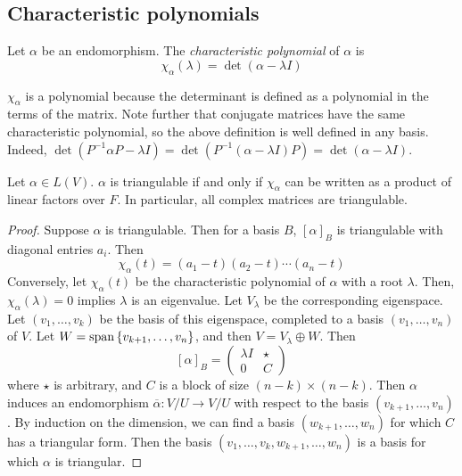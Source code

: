 \subsection{Characteristic polynomials}
\begin{definition}
	Let \( \alpha \) be an endomorphism.
	The \textit{characteristic polynomial} of \( \alpha \) is
	\[
		\chi_\alpha(\lambda) = \det(\alpha - \lambda I)
	\]
\end{definition}
\begin{remark}
	\( \chi_\alpha \) is a polynomial because the determinant is defined as a polynomial in the terms of the matrix.
	Note further that conjugate matrices have the same characteristic polynomial, so the above definition is well defined in any basis.
	Indeed, \( \det(P^{-1}\alpha P - \lambda I) = \det(P^{-1}(\alpha - \lambda I)P) = \det(\alpha - \lambda I) \).
\end{remark}
\begin{theorem}
	Let \( \alpha \in L(V) \).
	\( \alpha \) is triangulable if and only if \( \chi_\alpha \) can be written as a product of linear factors over \( F \).
	In particular, all complex matrices are triangulable.
\end{theorem}
\begin{proof}
	Suppose \( \alpha \) is triangulable.
	Then for a basis \( B \), \( [\alpha]_B \) is triangulable with diagonal entries \( a_i \).
	Then
	\[
		\chi_\alpha(t) = (a_1 - t)(a_2 - t) \cdots (a_n - t)
	\]
	Conversely, let \( \chi_\alpha(t) \) be the characteristic polynomial of \( \alpha \) with a root \( \lambda \).
	Then, \( \chi_\alpha(\lambda) = 0 \) implies \( \lambda \) is an eigenvalue.
	Let \( V_\lambda \) be the corresponding eigenspace.
	Let \( (v_1, \dots, v_k) \) be the basis of this eigenspace, completed to a basis \( (v_1, \dots, v_n) \) of \( V \).
	Let \( W = \operatorname{span}\qty{v_{k+1}, \dots, v_n} \), and then \( V = V_\lambda \oplus W \).
	Then
	\[
		[\alpha]_B = \begin{pmatrix}
			\lambda I & \star \\
			0         & C
		\end{pmatrix}
	\]
	where \( \star \) is arbitrary, and \( C \) is a block of size \( (n-k) \times (n-k) \).
	Then \( \alpha \) induces an endomorphism \( \overline \alpha \colon V/U \to V/U \) with respect to the basis \( (v_{k+1}, \dots, v_n) \).
	By induction on the dimension, we can find a basis \( (w_{k+1}, \dots, w_n) \) for which \( C \) has a triangular form.
	Then the basis \( (v_1, \dots, v_k, w_{k+1}, \dots, w_n) \) is a basis for which \( \alpha \) is triangular.
\end{proof}
